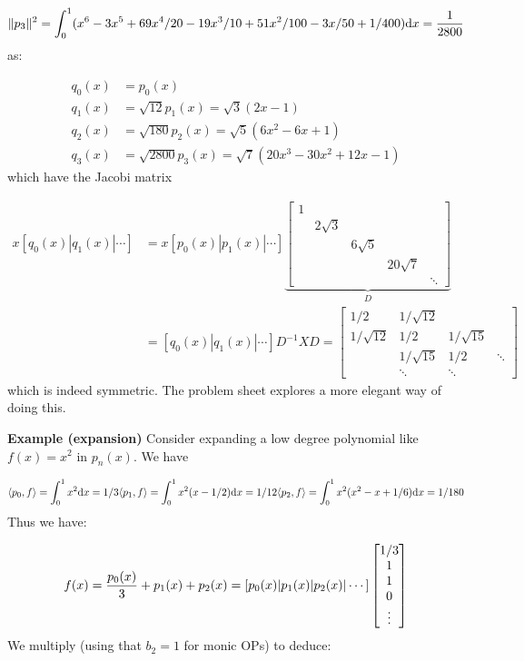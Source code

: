 \documentclass[12pt,a4paper]{article}
\begin{document}
\[
\|p_3\|^2 = \int_0^1 (x^6 - 3x^5 + 69x^4/20 -19x^3/10 + 51x^2/100 - 3x/50 + 1/400) {\rm d}x = {1 \over 2800}
\]
as:


\begin{align*}
q_0(x) &= p_0(x) \\
q_1(x) &= \sqrt{12} p_1(x)= \sqrt{3} (2  x - 1) \\
q_2(x) &= \sqrt{180} p_2(x) = \sqrt{5} (6x^2 - 6x + 1) \\
q_3(x) &= \sqrt{2800} p_3(x) = \sqrt{7} (20x^3-30x^2 + 12x - 1)
\end{align*}
which have the Jacobi matrix


\begin{align*}
x [q_0(x)| q_1(x)| \ensuremath{\cdots}] &= x [p_0(x)| p_1(x)| \ensuremath{\cdots}] \underbrace{\begin{bmatrix} 1 \\ & 2\sqrt{3} \\ && 6 \sqrt{5} \\ &&& 20 \sqrt{7} \\
&&&& \ensuremath{\ddots}
\end{bmatrix}}_D \\
&= [q_0(x)| q_1(x)| \ensuremath{\cdots}] D^{-1} X D = 
     \begin{bmatrix} 1/2 & 1/\sqrt{12} \\
                    1/\sqrt{12} & 1/2 &  1/\sqrt{15} \\
                    & 1/\sqrt{15} & 1/2 & \ensuremath{\ddots} \\
                    & \ensuremath{\ddots} & \ensuremath{\ddots} \end{bmatrix}
\end{align*}
which is indeed symmetric. The problem sheet explores a more elegant way of doing this.

\textbf{Example (expansion)} Consider expanding a low degree polynomial like $f(x) = x^2$ in $p_n(x)$. We have

\[
\ensuremath{\langle}p_0, f\ensuremath{\rangle} = \ensuremath{\int}_0^1 x^2 {\rm d} x = 1/3
\ensuremath{\langle}p_1, f\ensuremath{\rangle} = \ensuremath{\int}_0^1 x^2 (x - 1/2) {\rm d} x = 1/12
\ensuremath{\langle}p_2, f\ensuremath{\rangle} = \ensuremath{\int}_0^1 x^2 (x^2 - x + 1/6) {\rm d} x = 1/180
\]
Thus we have:

\[
f(x) = {p_0(x) \over 3} + p_1(x) + p_2(x) = [p_0(x) | p_1(x) | p_2(x) | \ensuremath{\cdots}] \begin{bmatrix} 1/3 \\ 1 \\ 1 \\ 0 \\ \ensuremath{\vdots} \end{bmatrix}
\]
We multiply (using that $b_2 = 1$ for monic OPs) to deduce:
\end{document}
